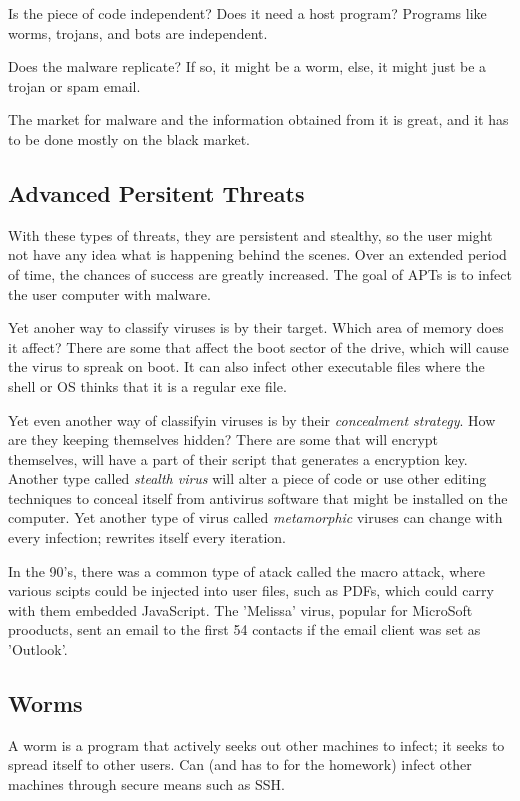 \documentclass{article}
\begin{document}
 Is the piece of code independent? Does it need a host program? Programs like worms, trojans, and bots are independent.

 Does the malware replicate? If so, it might be a worm, else, it might just be a trojan or spam email.

 The market for malware and the information obtained from it is great, and it has to be done mostly on the black market. 
 \subsection{Advanced Persitent Threats}
 With these types of threats, they are persistent and stealthy, so the user might not have any idea what is happening 
 behind the scenes. Over an extended period of time, the chances of success are greatly increased. 
 The goal of APTs is to infect the user computer with malware.

 Yet anoher way to classify viruses is by their target. Which area of memory does it affect? There are some that affect
 the boot sector of the drive, which will cause the virus to spreak on boot. It can also infect other executable files
 where the shell or OS thinks that it is a regular exe file. 

 Yet even another way of classifyin viruses is by their \textit{concealment strategy}. How are they keeping themselves 
 hidden? There are some that will encrypt themselves, will have a part of their script that generates a encryption key.
 Another type called \textit{stealth virus} will alter a piece of code or use other editing techniques to conceal 
 itself from antivirus software that might be installed on the computer. Yet another type of virus called 
 \textit{metamorphic} viruses can change with every infection; rewrites itself every iteration.

 In the 90's, there was a common type of atack called the macro attack, where various scipts could be injected into
 user files, such as PDFs, which could carry with them embedded JavaScript. The 'Melissa' virus, popular for MicroSoft
 prooducts, sent an email to the first 54  contacts if the email client was set as 'Outlook'.

 \subsection{Worms}
 A worm is a program that actively seeks out other machines to infect; it seeks to spread itself to other users. Can 
 (and has to for the homework) infect other machines through secure means such as SSH.
 
\end{document}
